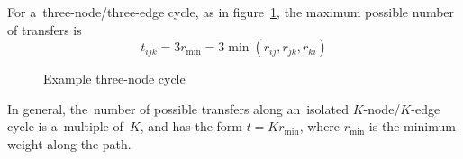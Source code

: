 \documentclass[paper=a4,parskip=half,DIV=12]{leetcode}
\begin{document}
For a~three-node/three-edge cycle, as in figure~\ref{fig:U5GUM}, the maximum
possible number of transfers is
\begin{equation}
  t_{ijk} = 3 r_{\min} = 3 \min{(r_{ij}, r_{jk}, r_{ki})}
 \label{eq:S95QR}
\end{equation}
\begin{figure}[htbp]
  \centering
  \caption{Example three-node cycle}
  \label{fig:U5GUM}
\end{figure}

In general, the~number of possible transfers along an~isolated
$K$-node/$K$-edge cycle is a~multiple of~$K$, and has the form
$t = K r_{\min}$, where $r_{\min}$ is the minimum weight along the path.

\end{document}
